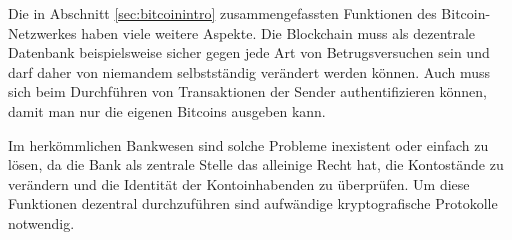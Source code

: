 Die in Abschnitt \ref{sec:bitcoinintro} zusammengefassten Funktionen des Bitcoin-Netzwerkes haben viele weitere Aspekte.
Die Blockchain muss als dezentrale Datenbank beispielsweise sicher gegen jede Art von Betrugsversuchen sein und darf daher von niemandem selbstständig verändert werden können.
Auch muss sich beim Durchführen von Transaktionen der Sender authentifizieren können, damit man nur die eigenen Bitcoins ausgeben kann.

Im herkömmlichen Bankwesen sind solche Probleme inexistent oder einfach zu lösen, da die Bank als zentrale Stelle das alleinige Recht hat, die Kontostände zu verändern und die Identität der Kontoinhabenden zu überprüfen.
Um diese Funktionen dezentral durchzuführen sind aufwändige kryptografische Protokolle notwendig.
